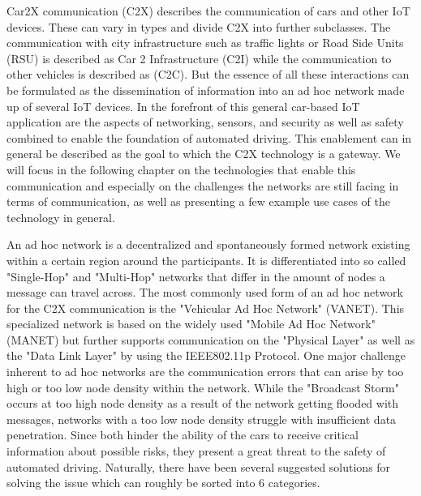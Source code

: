 \label{Se:car2Car}
Car2X communication (C2X) describes the communication of cars and other IoT devices. These can vary in types and divide C2X into further subclasses. The communication with city infrastructure such as traffic lights or Road Side Units (RSU) is described as Car 2 Infrastructure (C2I) while the communication to other vehicles is described as (C2C). But the essence of all these interactions can be formulated as the dissemination of information into an ad hoc network made up of several IoT devices. In the forefront of this general car-based IoT application are the aspects of networking, sensors, and security as well as safety combined to enable the foundation of automated driving. This enablement can in general be described as the goal to which the C2X technology is a gateway. We will focus in the following chapter on the technologies that enable this communication and especially on the challenges the networks are still facing in terms of communication, as well as presenting a few example use cases of the technology in general.

An ad hoc network is a decentralized and spontaneously formed network existing within a certain region around the participants. It is differentiated into so called "Single-Hop" and "Multi-Hop" networks that differ in the amount of nodes a message can travel across. The most commonly used form of an ad hoc network for the C2X communication is the "Vehicular Ad Hoc Network" (VANET).\cite{liu2019congestion} This specialized network is based on the widely used "Mobile Ad Hoc Network" (MANET) but further supports communication on the "Physical Layer" as well as the "Data Link Layer" by using the IEEE802.11p Protocol.
One major challenge inherent to ad hoc networks are the communication errors that can arise by too high or too low node density within the network. While the "Broadcast Storm" occurs at too high node density as a result of the network getting flooded with messages, networks with a too low node density struggle with insufficient data penetration. Since both hinder the ability of the cars to receive critical information about possible risks, they present a great threat to the safety of automated driving.
Naturally, there have been several suggested solutions for solving the issue which can roughly be sorted into 6 categories. \cite{rashid2020overview} \cite{rashid2020reliable}

